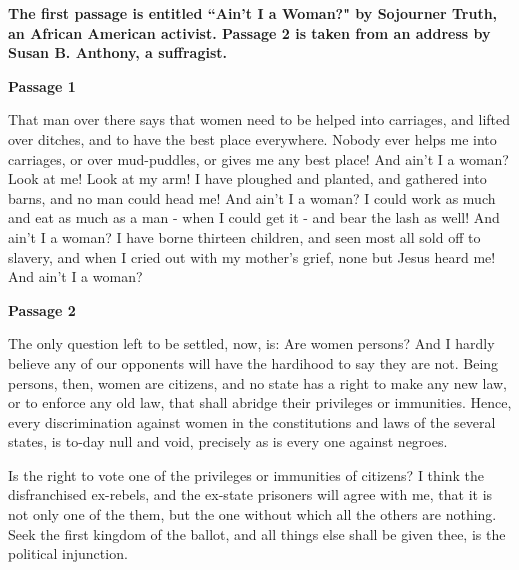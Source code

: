 \bigskip
\textbf{The first passage is entitled ``Ain't I a Woman?" by Sojourner Truth, an African American activist. Passage 2 is taken from an address by Susan B. Anthony, a suffragist.}

\bigskip
\textbf{Passage 1}

\bigskip
\begin{linenumbers*}
\modulolinenumbers[5]
\indent That man over there says that women need to be helped into carriages, and lifted over ditches, and to have the best place everywhere. Nobody ever helps me into carriages, or over mud-puddles, or gives me any best place! And ain't I a woman? Look at me! Look at my arm! I have ploughed and planted, and gathered into barns, and no man could head me! And ain't I a woman? I could work as much and eat as much as a man - when I could get it - and bear the lash as well! And ain't I a woman? I have borne thirteen children, and seen most all sold off to slavery, and when I cried out with my mother's grief, none but Jesus heard me! And ain't I a woman?
\end{linenumbers*}

\bigskip
\textbf{Passage 2}

\bigskip
\begin{linenumbers}
\modulolinenumbers[5]
\indent The only question left to be settled, now, is: Are women persons? And I hardly believe any of our opponents will have the hardihood to say they are not. Being persons, then, women are citizens, and no state has a right to make any new law, or to enforce any old law, that shall abridge their privileges or immunities. Hence, every discrimination against women in the constitutions and laws of the several states, is to-day null and void, precisely as is every one against negroes.

\indent Is the right to vote one of the privileges or immunities of citizens? I think the disfranchised ex-rebels, and the ex-state prisoners will agree with me, that it is not only one of the them, but the one without which all the others are nothing. Seek the first kingdom of the ballot, and all things else shall be given thee, is the political injunction.
\end{linenumbers}

